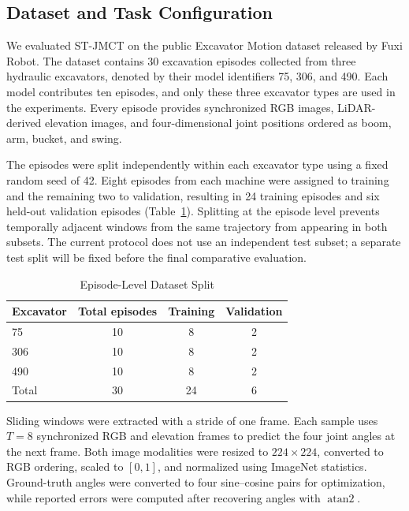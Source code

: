 \documentclass[journal]{IEEEtran}
\begin{document}
\subsection{Dataset and Task Configuration}
\label{subsec:dataset}

We evaluated ST-JMCT on the public Excavator Motion dataset released by Fuxi
Robot. The dataset contains 30 excavation episodes collected from three
hydraulic excavators, denoted by their model identifiers 75, 306, and 490.
Each model contributes ten episodes, and only these three excavator types are
used in the experiments. Every episode provides synchronized RGB images,
LiDAR-derived elevation images, and four-dimensional joint positions ordered
as boom, arm, bucket, and swing.

The episodes were split independently within each excavator type using a fixed
random seed of 42. Eight episodes from each machine were assigned to training
and the remaining two to validation, resulting in 24 training episodes and six
held-out validation episodes (Table~\ref{tab:dataset_split}). Splitting at the
episode level prevents temporally adjacent windows from the same trajectory
from appearing in both subsets. The current protocol does not use an
independent test subset; a separate test split will be fixed before the final
comparative evaluation.

\begin{table}[!t]
\caption{Episode-Level Dataset Split}
\label{tab:dataset_split}
\centering
\begin{tabular}{lccc}
\toprule
Excavator & Total episodes & Training & Validation \\
\midrule
75  & 10 & 8 & 2 \\
306 & 10 & 8 & 2 \\
490 & 10 & 8 & 2 \\
\midrule
Total & 30 & 24 & 6 \\
\bottomrule
\end{tabular}
\end{table}

Sliding windows were extracted with a stride of one frame. Each sample uses
$T=8$ synchronized RGB and elevation frames to predict the four joint angles
at the next frame. Both image modalities were resized to $224\times224$,
converted to RGB ordering, scaled to $[0,1]$, and normalized using ImageNet
statistics. Ground-truth angles were converted to four sine--cosine pairs for
optimization, while reported errors were computed after recovering angles with
$\operatorname{atan2}$.
\end{document}
